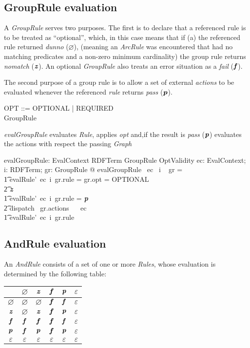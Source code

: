 \documentclass[fuzz]{llncs}
\def\pass{\textbf{\textit{p}}}
\def\fail{\textbf{\textit{f}}}
\def\dunno{\varnothing}
\def\error{\varepsilon}
\def\nomatch{\textbf{\textit{z}}}
\def\zc{\textit}
\def\zcb{\textit{\textbf}}
\begin{document}
\subsection{GroupRule evaluation}
A \zc{GroupRule} serves two purposes.  The first is to declare that a referenced rule is to be
treated as ``optional'', which, in this case means that if (a) the referenced rule returned
\zc{dunno} ($\dunno$), (meaning an \zc{ArcRule} was encountered that had no matching
predicates and a non-zero minimum cardinality) the group rule returns \zc{nomatch} 
($\nomatch$).  An optional \zc{GroupRule} also treats an error situation as a \zc{fail} 
($\fail$).

The second purpose of a group rule is to allow a set of external \zc{actions} to be evaluated
whenever the referenced \zc{rule} returns \zc{pass} ($\pass$). 


\begin{zed}
OPT ::= OPTIONAL | REQUIRED \\
GroupRule  \\
\end{zed}
\zc{evalGroupRule} evaluates \zc{Rule}, applies \zc{opt} and,if the result is \zc{pass} ($\pass$) evaluates the actions with respect the passing \zc{Graph} 
\begin{gendef}
   evalGroupRule: EvalContext \fun RDFTerm \fun GroupRule \fun OptValidity
\where
   \forall ec: EvalContext; i: RDFTerm; gr: GroupRule @ evalGroupRule~ ec~ i ~ gr = \\
\t1 \IF evalRule'~ec~i~gr.rule = \dunno \land gr.opt = OPTIONAL \\
\t2 \THEN \nomatch \\
\t1 \ELSE \IF evalRule'~ec~i~gr.rule = \pass \\
\t2 \THEN dispatch~ gr.actions~ \emptyset ~ ec \\
\t1 \ELSE evalRule'~ec~i~gr.rule
\end{gendef}

\subsection{AndRule evaluation}
An \zc{AndRule} consists of a set of one or more \zc{Rules}, whose evaluation is determined
by the following table: \\

\begin{tabular}{c || c | c | c | c | c |}
   \hline 
   \zcb{And} & $\dunno$ & $\nomatch$ & $\fail$ & $\pass$ & $\error$ \\
   \hline \hline
   $\dunno$ & $\dunno$ & $\dunno$ & $\fail$ & $\fail$ & $\error$ \\ \hline
   $\nomatch$ & $\dunno$ & $\nomatch$ & $\fail$ & $\pass$ & $\error$ \\ \hline
   $\fail$ & $\fail$ & $\fail$ & $\fail$ & $\fail$ & $\error$ \\ \hline
   $\pass$ & $\fail$ & $\pass$ & $\fail$ & $\pass$ & $\error$ \\ \hline
   $\error$ & $\error$ & $\error$ & $\error$ & $\error$ & $\error$ \\ \hline 
\end{tabular} \\
\end{document}
